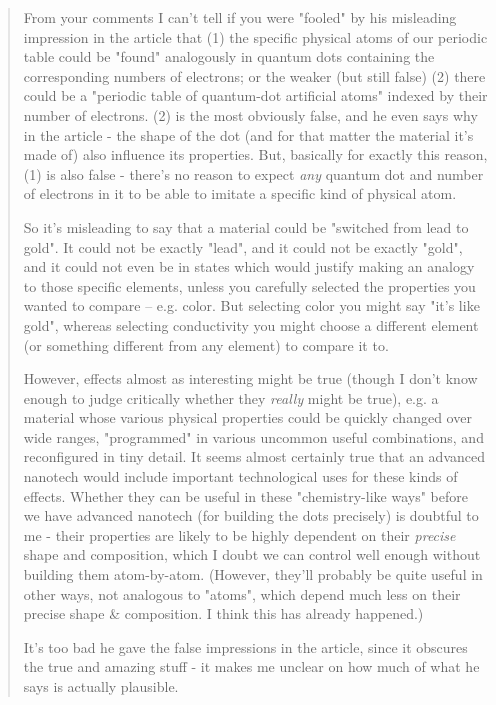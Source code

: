 \begin{quote}
From your comments I can't tell if you were "fooled" by his misleading
impression in the article that (1) the specific physical atoms of our
periodic table could be "found" analogously in quantum dots containing
the corresponding numbers of electrons; or the weaker (but still false)
(2) there could be a "periodic table of quantum-dot artificial atoms"
indexed by their number of electrons. (2) is the most obviously false,
and he even says why in the article - the shape of the dot (and for
that matter the material it's made of) also influence its properties.
But, basically for exactly this reason, (1) is also false - there's
no reason to expect \emph{any} quantum dot and number of electrons in it
to be able to imitate a specific kind of physical atom.

So it's misleading to say that a material could be "switched from lead
to gold". It could not be exactly "lead", and it could not be exactly "gold",
and it could not even be in states which would justify making an analogy
to those specific elements, unless you carefully selected the properties
you wanted to compare -- e.g. color. But selecting color you might say
"it's like gold", whereas selecting conductivity you might choose a
different element (or something different from any element) to compare it to.

However, effects almost as interesting might be true (though I don't know
enough to judge critically whether they \emph{really} might be true), e.g.
a material whose various physical properties could be quickly changed
over wide ranges, "programmed" in various uncommon useful combinations,
and reconfigured in tiny detail. It seems almost certainly true that
an advanced nanotech would include important technological uses for these
kinds of effects. Whether they can be useful in these "chemistry-like ways"
before we have advanced nanotech (for building the dots precisely) is
doubtful to me - their properties are likely to be highly dependent on
their \emph{precise} shape and composition, which I doubt we can control well
enough without building them atom-by-atom. (However, they'll probably be
quite useful in other ways, not analogous to "atoms", which depend much less
on their precise shape & composition. I think this has already happened.)

It's too bad he gave the false impressions in the article, since it obscures
the true and amazing stuff - it makes me unclear on how much of what
he says is actually plausible.


\end{quote}
